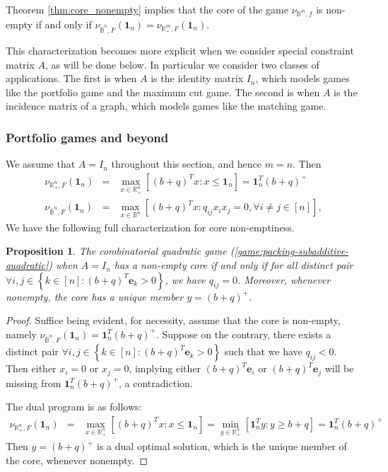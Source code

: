 \documentclass[11pt]{article}\usepackage[]{graphicx}\usepackage[]{xcolor}
\newtheorem{prop}{Proposition}
\begin{document}
Theorem \ref{thm:core_nonempty} implies that the core of the game $\nu_{\mathbb{B}^m,f}$ is non-empty if and only if $\nu_{\overline{\mathbb{B}}^n, F}\left(\mathbf{1}_n\right)=\nu_{\mathbb{R}^m_{+},F}\left(\mathbf{1}_n\right)$. 

This characterization becomes more explicit when we consider special constraint matrix $A$, as will be done below. In particular we consider two classes of applications. The first is when $A$ is the identity matrix $I_{n}$, which models games like the portfolio game and the maximum cut game. The second is when $A$ is the incidence matrix of a graph, which models games like the matching game. 


\subsubsection{Portfolio games and beyond}\label{sec:unconstrained-qp}
We assume that $A=I_{n}$ throughout this section, and hence $m=n$. 
Then 
\begin{eqnarray*}
\nu_{\mathbb{R}^n_{+},F}\left(\mathbf{1}_n\right)&=&\max\limits_{x\in \mathbb{R}^n_{+}} \left[(b+q)^Tx: x\le \mathbf{1}_n\right]=\mathbf{1}_n^T(b+q)^{+}\\
\nu_{\overline{\mathbb{B}}^n, F}\left(\mathbf{1}_n\right)&=&\max\limits_{x\in \mathbb{B}^n} \left[(b+q)^Tx: q_{ij}x_ix_j=0, \forall i\ne j\in [n]\right],
\end{eqnarray*}
We have the following full characterization for core non-emptiness. 
\begin{prop}\label{prop:quad-game} The combinatorial quadratic game (\ref{game:packing-subadditive-quadratic}) when $A=I_n$ has a non-empty core if and only if for all distinct pair 
$\forall i, j\in \left\{k\in [n]: (b+q)^T\mathbf{e}_k>0\right\}$, we have $q_{ij}=0$. Moreover, whenever nonempty, the core has a unique member $y=(b+q)^{+}$.
\end{prop}
\begin{proof} Suffice being evident, for necessity, assume that the core is non-empty, namely $\nu_{\overline{\mathbb{B}}^n, F}\left(\mathbf{1}_n\right)=\mathbf{1}_n^T(b+q)^{+}$. Suppose on the contrary, there exists a distinct pair $\forall i, j\in \left\{k\in [n]: (b+q)^T\mathbf{e}_k>0\right\}$ such that we have $q_{ij}<0$. Then either $x_i=0$ or $x_j=0$, implying either $(b+q)^T\mathbf{e}_i$ or $(b+q)^T\mathbf{e}_j$ will be missing from $\mathbf{1}_n^T(b+q)^{+}$, a contradiction.

The dual program is as follows:
\begin{eqnarray*}
\nu_{\mathbb{R}^n_{+},F}\left(\mathbf{1}_n\right)&=&\max\limits_{x\in \mathbb{R}^n_{+}} \left[(b+q)^Tx: x\le \mathbf{1}_n\right]=\min\limits_{y\in \mathbb{R}^n_{+}} \left[\mathbf{1}_n^Ty: y\ge b+q\right]=\mathbf{1}_n^T(b+q)^{+}
\end{eqnarray*}
Then $y=(b+q)^{+}$ is a dual optimal solution, which is the unique member of the core, whenever nonempty. 

\end{proof}
\end{document}
